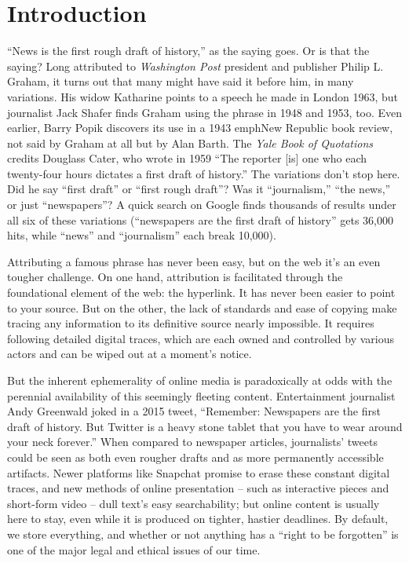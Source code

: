 \chapter{Introduction}

``News is the first rough draft of history,'' as the saying goes. Or is that the saying? Long attributed to \emph{Washington Post} president and publisher Philip L. Graham, it turns out that many might have said it before him, in many variations. His widow Katharine points to a speech he made in London 1963, but journalist Jack Shafer finds Graham using the phrase in 1948 and 1953, too.\autocite{shafer_who_2010} Even earlier, Barry Popik discovers its use in a 1943 emph{New Republic} book review, not said by Graham at all but by Alan Barth. The \emph{Yale Book of Quotations} credits Douglass Cater, who wrote in 1959 ``The reporter [is] one who each twenty-four hours dictates a first draft of history.''\autocite[139]{shapiro_yale_2006} The variations don't stop here. Did he say ``first draft'' or ``first rough draft''? Was it ``journalism,'' ``the news,'' or just ``newspapers''? A quick search on Google finds thousands of results under all six of these variations (``newspapers are the first draft of history'' gets 36,000 hits, while ``news'' and ``journalism'' each break 10,000).

Attributing a famous phrase has never been easy, but on the web it's an even tougher challenge. On one hand, attribution is facilitated through the foundational element of the web: the hyperlink. It has never been easier to point to your source. But on the other, the lack of standards and ease of copying make tracing any information to its definitive source nearly impossible. It requires following detailed digital traces, which are each owned and controlled by various actors and can be wiped out at a moment's notice.

But the inherent ephemerality of online media is paradoxically at odds with the perennial availability of this seemingly fleeting content. Entertainment journalist Andy Greenwald joked in a 2015 tweet, ``Remember: Newspapers are the first draft of history. But Twitter is a heavy stone tablet that you have to wear around your neck forever.''\autocite{greenwald_remember:_2015} When compared to newspaper articles, journalists' tweets could be seen as both even rougher drafts and as more permanently accessible artifacts. Newer platforms like Snapchat promise to erase these constant digital traces, and new methods of online presentation -- such as interactive pieces and short-form video -- dull text's easy searchability; but online content is usually here to stay, even while it is produced on tighter, hastier deadlines. By default, we store everything, and whether or not anything has a ``right to be forgotten'' is one of the major legal and ethical issues of our time.\autocites[See, e.g.,][]{arthur_explaining_2014}{hakim_right_2014}

